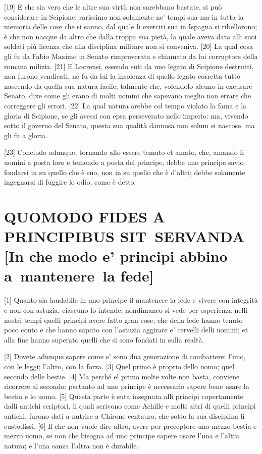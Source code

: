 \quebra

{[}19{]} E che sia vero che le altre sua virtù non sarebbano bastate, si
può considerare in Scipione, rarissimo non solamente ne' tempi sua ma in
tutta la memoria delle cose che si sanno, dal quale li exerciti sua in
Ispagna si ribellorono; è che non nacque da altro che dalla troppa sua
pietà, la quale aveva data alli suoi soldati più licenza che alla
disciplina militare non si conveniva. {[}20{]} La qual cosa gli fu da
Fabio Maximo in Senato rimproverata e chiamato da lui corruptore della
romana milizia. {[}21{]} E Locrensi, essendo suti da uno legato di
Scipione destrutti, non furono vendicati, né fu da lui la insolenza di
quello legato corretta tutto nascendo da quella sua natura facile;
talmente che, volendolo alcuno in excusare Senato, dixe come gli erano
di molti uomini che sapevano meglio non errare che correggere gli
errori. {[}22{]} La qual natura arebbe col tempo violato la fama e la
gloria di Scipione, se gli avessi con epsa perseverato nello imperio:
ma, vivendo sotto il governo del Senato, questa sua qualità dannosa non
solum si nascose, ma gli fu a gloria.

{[}23{]} Concludo adunque, tornando allo essere temuto et amato, che,
amando li uomini a posta loro e temendo a posta del principe, debbe uno
principe savio fondarsi in su quello che è suo, non in su quello che è
d'altri; debbe solamente ingegnarsi di fuggire lo odio, come è detto.

\quebra\section{QUOMODO FIDES A PRINCIPIBUS SIT~SERVANDA\break
{[}In che modo e' principi abbino a~mantenere~la fede{]}}

{[}1{]} Quanto sia laudabile in uno principe il mantenere la fede e
vivere con integrità e non con astuzia, ciascuno lo intende; nondimanco
si vede per esperienza nelli nostri tempi quelli principi avere fatto
gran cose, che della fede hanno tenuto poco conto e che hanno saputo con
l'astuzia aggirare e' cervelli delli uomini; et alla fine hanno superato
quelli che si sono fondati in sulla realtà.

{[}2{]} Dovete adunque sapere come e' sono dua generazione di
combattere: l'uno, con le leggi; l'altro, con la forza. {[}3{]} Quel
primo è proprio dello uomo; quel secondo delle bestie. {[}4{]} Ma perché
el primo molte volte non basta, conviene ricorrere al secondo: pertanto
ad uno principe è necessario sapere bene usare la bestia e lo uomo.
{[}5{]} Questa parte è suta insegnata alli principi copertamente dalli
antichi scriptori, li quali scrivono come Achille e molti altri di
quelli principi antichi, furono dati a nutrire a Chirone centauro, che
sotto la sua disciplina li custodissi. {[}6{]} Il che non vuole dire
altro, avere per preceptore uno mezzo bestia e mezzo uomo, se non che
bisogna ad uno principe sapere usare l'una e l'altra natura; e l'una
sanza l'altra non è durabile.

